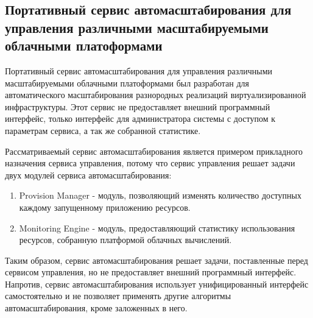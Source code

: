 \subsection{Портативный сервис автомасштабирования для управления различными масштабируемыми облачными платоформами}
Портативный сервис автомасштабирования для управления различными масштабируемыми облачными платоформами\cite{portable-autoscaler-for-managing-multi-cloud-elasticity} был разработан для автоматического масштабирования разнородных реализаций виртуализированной инфраструктуры.
Этот сервис не предоставляет внешний программный интерфейс, только интерфейс для администратора системы с доступом к параметрам сервиса, а так же собранной статистике.

Рассматриваемый сервис автомасштабирования является примером прикладного назначения сервиса управления, потому что сервис управления решает задачи двух модулей сервиса автомасштабирования:
\begin{enumerate}
    \item Provision Manager - модуль, позволяющий изменять количество доступных каждому запущенному приложению ресурсов.
    \item Monitoring Engine - модуль, предоставляющий статистику использования ресурсов, собранную платформой облачных вычислений.
\end{enumerate}

Таким образом, сервис автомасштабирования решает задачи, поставленные перед сервисом управления, но не предоставляет внешний программный интерфейс.
Напротив, сервис автомасштабирования использует унифицированный интерфейс самостоятельно и не позволяет применять другие алгоритмы автомасштабирования, кроме заложенных в него.